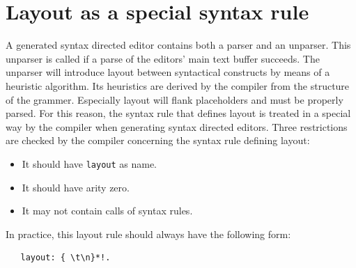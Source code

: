 \section {Layout as a special syntax rule}
A generated syntax directed editor contains both a parser and
an unparser. This unparser is called if a parse of
the editors' main text buffer succeeds. The unparser will
introduce layout between syntactical constructs
by means of a heuristic algorithm. Its heuristics are
derived by the \EAG compiler from the structure of the
grammer. Especially layout will flank placeholders and must
be properly parsed. For this reason, the syntax rule that defines
layout is treated in a special way by the \EAG compiler when
generating syntax directed editors. Three restrictions are checked
by the compiler concerning the syntax rule defining layout:
\begin {itemize}
\item
It should have {\tt layout} as name.
\item
It should have arity zero.
\item
It may not contain calls of syntax rules.
\end{itemize}
In practice, this layout rule should always have the following
form:
\begin{verbatim}
   layout: { \t\n}*!.
\end{verbatim}
